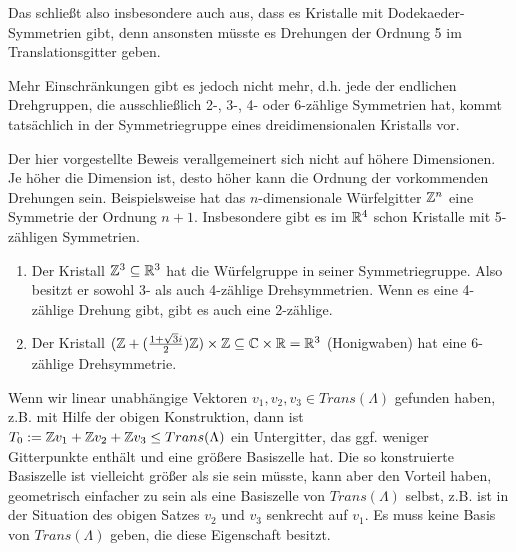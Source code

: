 \begin{remark}
Das schließt also insbesondere auch aus, dass es Kristalle mit Dodekaeder-Symmetrien gibt, denn ansonsten müsste es Drehungen der Ordnung 5 im Translationsgitter geben.

Mehr Einschränkungen gibt es jedoch nicht mehr, d.h. jede der endlichen Drehgruppen, die ausschließlich 2-, 3-, 4- oder 6-zählige Symmetrien hat, kommt tatsächlich in der Symmetriegruppe eines dreidimensionalen Kristalls vor.

Der hier vorgestellte Beweis verallgemeinert sich nicht auf höhere Dimensionen. Je höher die Dimension ist, desto höher kann die Ordnung der vorkommenden Drehungen sein. Beispielsweise hat das $n$-dimensionale Würfelgitter $\mathbb{Z}^n$ eine Symmetrie der Ordnung $n+1$. Insbesondere gibt es im $\mathbb{R}^4$ schon Kristalle mit 5-zähligen Symmetrien.
\end{remark}

\begin{example}
\begin{enumerate}
\item Der Kristall $\mathbb{Z}^3\subseteq\mathbb{R}^3$ hat die Würfelgruppe in seiner Symmetriegruppe. Also besitzt er sowohl 3- als auch 4-zählige Drehsymmetrien. Wenn es eine 4-zählige Drehung gibt, gibt es auch eine 2-zählige.
\item Der Kristall $(\mathbb{Z}+(\frac{1+\sqrt{3}i}{2})\mathbb{Z}) \times \mathbb{Z} \subseteq \mathbb{C}\times\mathbb{R} = \mathbb{R}^3$ (Honigwaben) hat eine 6-zählige Drehsymmetrie.
\end{enumerate}
\end{example}

\begin{remark}
Wenn wir linear unabhängige Vektoren $v_1,v_2,v_3\in Trans(\Lambda)$ gefunden haben, z.B. mit Hilfe der obigen Konstruktion, dann ist $T_0:=\mathbb{Z} v_1+\mathbb{Z} v_2+\mathbb{Z} v_3 \leq Trans(\Lambda)$ ein Untergitter, das ggf. weniger Gitterpunkte enthält und eine größere Basiszelle hat. Die so konstruierte Basiszelle ist vielleicht größer als sie sein müsste, kann aber den Vorteil haben, geometrisch einfacher zu sein als eine Basiszelle von $Trans(\Lambda)$ selbst, z.B. ist in der Situation des obigen Satzes $v_2$ und $v_3$ senkrecht auf $v_1$. Es muss keine Basis von $Trans(\Lambda)$ geben, die diese Eigenschaft besitzt.
\end{remark}